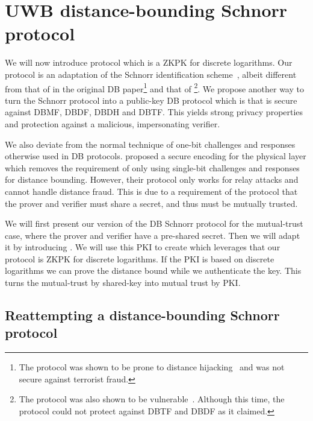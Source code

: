 \section{UWB distance-bounding Schnorr protocol}%
\label{DB-Schnorr-UWB}

We will now introduce  protocol which is a \ac{ZKPK} for discrete 
logarithms.
Our protocol is an adaptation of the Schnorr identification 
scheme~\cite{Schnorr}, albeit different from that of 
\textcite{DistanceBounding} in the original \ac{DB} paper\footnote{%
  The \citeauthor{DistanceBounding} protocol was shown to be prone to distance 
  hijacking~\cite{DistanceHijacking,TamarinDB} and was not secure against 
  terrorist fraud.
} and that of \textcite{Bussard-Bagga}\footnote{%
  The \citeauthor{Bussard-Bagga} protocol was also shown to be 
  vulnerable~\cite{Bussard-Bagga-attack}.
  Although this time, the protocol could not protect against \ac{DBTF} and 
  \ac{DBDF} as it claimed.
}.
We propose another way to turn the Schnorr protocol into a public-key \ac{DB} 
protocol which is  that is secure against \ac{DBMF}, \ac{DBDF}, 
\ac{DBDH} and \ac{DBTF}.
This yields strong privacy properties and protection against a malicious, 
impersonating verifier.

We also deviate from the normal technique of one-bit challenges and responses 
otherwise used in \ac{DB} protocols.
\Textcite{UWBPR} proposed a secure encoding for the physical 
layer which removes the requirement of only using single-bit challenges and 
responses for distance bounding.
However, their protocol only works for relay attacks and cannot handle distance 
fraud.
This is due to a requirement of the protocol that the prover and verifier must 
share a secret, and thus must be mutually trusted.

We will first present our version of the \ac{DB} Schnorr protocol for the 
mutual-trust case, where the prover and verifier have a pre-shared secret.
Then we will adapt it by introducing .
We will use this \ac{PKI} to create  which leverages that our protocol 
is  \ac{ZKPK} for discrete logarithms.
If the \ac{PKI} is based on discrete logarithms we can prove the distance bound 
while we authenticate the key.
This turns the mutual-trust by shared-key into mutual trust by 
\ac{PKI}.


\subsection{Reattempting a distance-bounding Schnorr protocol}%
\label{DB-Schnorr}

